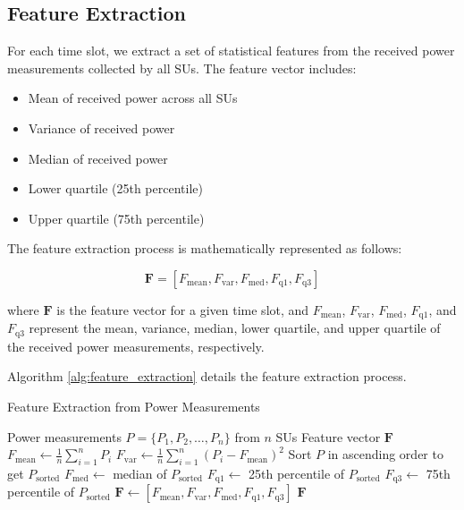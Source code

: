 \documentclass[conference]{IEEEtran}
\begin{document}
\subsection{Feature Extraction}

For each time slot, we extract a set of statistical features from the received power measurements collected by all SUs. The feature vector includes:

\begin{itemize}
    \item Mean of received power across all SUs
    \item Variance of received power
    \item Median of received power
    \item Lower quartile (25th percentile)
    \item Upper quartile (75th percentile)
\end{itemize}

The feature extraction process is mathematically represented as follows:

\begin{equation}
\mathbf{F} = [F_{\text{mean}}, F_{\text{var}}, F_{\text{med}}, F_{\text{q1}}, F_{\text{q3}}]
\end{equation}

where $\mathbf{F}$ is the feature vector for a given time slot, and $F_{\text{mean}}$, $F_{\text{var}}$, $F_{\text{med}}$, $F_{\text{q1}}$, and $F_{\text{q3}}$ represent the mean, variance, median, lower quartile, and upper quartile of the received power measurements, respectively.

Algorithm \ref{alg:feature_extraction} details the feature extraction process.

\begin{algorithm}
\caption{Feature Extraction from Power Measurements}
\label{alg:feature_extraction}
\begin{algorithmic}[1]
\REQUIRE Power measurements $P = \{P_1, P_2, \ldots, P_n\}$ from $n$ SUs
\ENSURE Feature vector $\mathbf{F}$
\STATE $F_{\text{mean}} \gets \frac{1}{n}\sum_{i=1}^{n} P_i$
\STATE $F_{\text{var}} \gets \frac{1}{n}\sum_{i=1}^{n} (P_i - F_{\text{mean}})^2$
\STATE Sort $P$ in ascending order to get $P_{\text{sorted}}$
\STATE $F_{\text{med}} \gets$ median of $P_{\text{sorted}}$
\STATE $F_{\text{q1}} \gets$ 25th percentile of $P_{\text{sorted}}$
\STATE $F_{\text{q3}} \gets$ 75th percentile of $P_{\text{sorted}}$
\STATE $\mathbf{F} \gets [F_{\text{mean}}, F_{\text{var}}, F_{\text{med}}, F_{\text{q1}}, F_{\text{q3}}]$
\RETURN $\mathbf{F}$
\end{algorithmic}
\end{algorithm}
\end{document}
